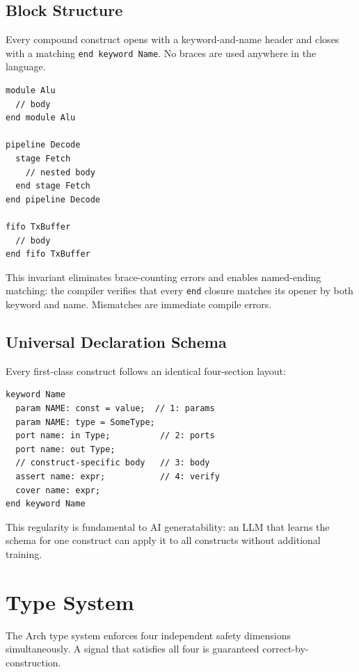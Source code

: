 \documentclass[manuscript]{acmart}
\begin{document}
\subsection{Block Structure}

Every compound construct opens with a keyword-and-name header and closes with a matching \texttt{end keyword Name}. No braces are used anywhere in the language.

\begin{lstlisting}[language=Arch,caption={Universal block grammar},label={lst:block}]
module Alu
  // body
end module Alu

pipeline Decode
  stage Fetch
    // nested body
  end stage Fetch
end pipeline Decode

fifo TxBuffer
  // body
end fifo TxBuffer
\end{lstlisting}

This invariant eliminates brace-counting errors and enables named-ending matching: the compiler verifies that every \texttt{end} closure matches its opener by both keyword and name. Mismatches are immediate compile errors.

\subsection{Universal Declaration Schema}

Every first-class construct follows an identical four-section layout:

\begin{lstlisting}[language=Arch,caption={Universal schema},label={lst:schema}]
keyword Name
  param NAME: const = value;  // 1: params
  param NAME: type = SomeType;
  port name: in Type;          // 2: ports
  port name: out Type;
  // construct-specific body   // 3: body
  assert name: expr;           // 4: verify
  cover name: expr;
end keyword Name
\end{lstlisting}

This regularity is fundamental to AI generatability: an LLM that learns the schema for one construct can apply it to all constructs without additional training.

\section{Type System}\label{sec:types}

The Arch type system enforces four independent safety dimensions simultaneously. A signal that satisfies all four is guaranteed correct-by-construction.
\end{document}
